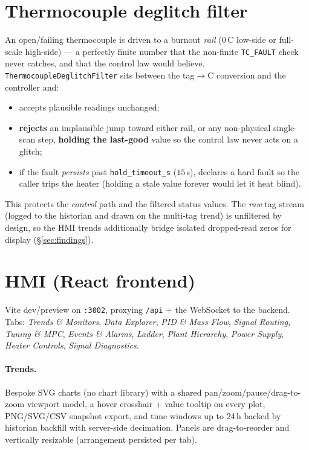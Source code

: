 \documentclass[11pt]{article}
\newcommand{\code}[1]{\texttt{#1}}
\begin{document}
\section{Thermocouple deglitch filter}\label{sec:deglitch}
An open/failing thermocouple is driven to a burnout \emph{rail} (0\,\textdegree C
low-side or full-scale high-side) --- a perfectly finite number that the
non-finite \code{TC\_FAULT} check never catches, and that the control law would
believe. \code{ThermocoupleDeglitchFilter} sits between the tag$\rightarrow$\textdegree C
conversion and the controller and:

\begin{itemize}[nosep]
  \item accepts plausible readings unchanged;
  \item \textbf{rejects} an implausible jump toward either rail, or any
  non-physical single-scan step, \textbf{holding the last-good} value so the
  control law never acts on a glitch;
  \item if the fault \emph{persists} past \code{hold\_timeout\_s} ($15$\,s),
  declares a hard fault so the caller trips the heater (holding a stale value
  forever would let it heat blind).
\end{itemize}

\noindent This protects the \emph{control} path and the filtered status values.
The \emph{raw} tag stream (logged to the historian and drawn on the multi-tag
trend) is unfiltered by design, so the HMI trends additionally bridge isolated
dropped-read zeros for display (\S\ref{sec:findings}).

\section{HMI (React frontend)}
Vite dev/preview on \code{:3002}, proxying \code{/api} + the WebSocket to the
backend. Tabs: \emph{Trends \& Monitors}, \emph{Data Explorer}, \emph{PID \& Mass
Flow}, \emph{Signal Routing}, \emph{Tuning \& MPC}, \emph{Events \& Alarms},
\emph{Ladder}, \emph{Plant Hierarchy}, \emph{Power Supply}, \emph{Heater
Controls}, \emph{Signal Diagnostics}.

\paragraph{Trends.} Bespoke SVG charts (no chart library) with a shared
pan/zoom/pause/drag-to-zoom viewport model, a hover crosshair + value tooltip on
every plot, PNG/SVG/CSV snapshot export, and time windows up to 24\,h backed by
historian backfill with server-side decimation. Panels are drag-to-reorder and
vertically resizable (arrangement persisted per tab).
\end{document}
